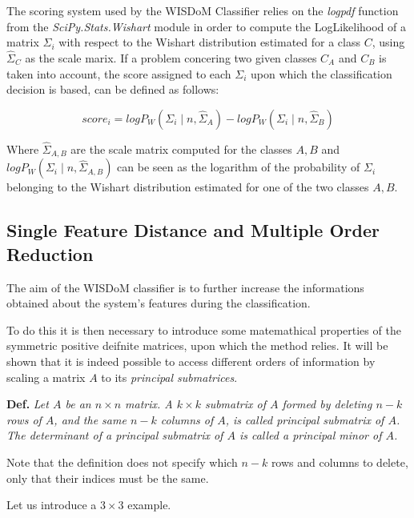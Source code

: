 \documentclass[12pt,openright,twoside,a4paper]{book}
\begin{document}
The scoring system used by the WISDoM Classifier relies on the \textit{logpdf} function from the \textit{SciPy.Stats.Wishart} module in order to compute the LogLikelihood of a matrix $\Sigma_i$ with respect to the Wishart distribution estimated for a class $C$, using $\hat{\Sigma}_C$ as the scale marix.
If a problem concering two given classes $C_A$ and $C_B$ is taken into account, the score assigned to each $\Sigma_i$ upon which the classification decision is based, can be defined as follows:

\begin{equation}
score_{i}= logP_{W}(\Sigma_{i}\mid n, \hat{\Sigma}_{A})-logP_{W}(\Sigma_{i}\mid n,\hat{\Sigma}_{B})
\label{pdf-score}
\end{equation}

Where $\hat{\Sigma}_{A,B}$ are the scale matrix computed for the classes $A,B$ and $ logP_{W}(\Sigma_{i}\mid n, \hat{\Sigma}_{A,B})$ can be seen as the logarithm of the probability of $\Sigma_i$ belonging to the Wishart distribution estimated for one of the two classes $A,B$.

\subsection{Single Feature Distance and Multiple Order Reduction}

The aim of the WISDoM classifier is to further increase the informations obtained about the system's features during the classification.

To do this it is then necessary to introduce some matemathical properties of the symmetric positive deifnite matrices, upon which the method relies.
It will be shown that it is indeed possible to access different orders of information by scaling a matrix $A$ to its \textit{principal submatrices}.

\vspace{5mm}

\textbf{Def.} \textit{Let $A$ be an $n \times n$ matrix. A $k \times k$ submatrix of $A$ formed by deleting $n-k$ rows of $A$, and the same $n-k$ columns of $A$, is called principal submatrix of $A$. The determinant of a principal submatrix of $A$ is called a principal minor of $A$.}

\vspace{5mm}

Note that the definition does not specify which $n-k$ rows and columns to delete, only that their indices must be the same.

Let us introduce a $3 \times 3$ example.
\end{document}
